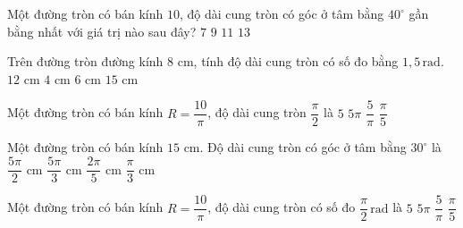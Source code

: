 

\begin{ex}%
	Một  đường tròn có bán kính $10$, độ dài cung tròn có góc ở tâm bằng $40^\circ$ gần bằng nhất với giá trị nào sau đây?
	 \choice
		{\True $7$} 
		{$9$} 
		 {$11$}
		 {$13$}
\end{ex}

\begin{ex}%
	Trên đường tròn đường kính $8$ cm, tính độ  dài cung tròn có số đo bằng $1{,}5\,\mathrm{rad}$.
	 \choice
		{$12$  cm}
		{$4$ cm} 
		{\True $6$  cm}
		{$15$  cm}
\end{ex}

\begin{ex}%
	Một đường tròn có bán kính $R=\dfrac{10}{\pi}$, độ dài cung tròn $\dfrac{\pi}{2}$ là 
	\choice 
		{\True $5$} 
		{$5\pi$} 
		{$\dfrac{5}{\pi}$} 
		{$\dfrac{\pi}{5}$} 
\end{ex}

\begin{ex}%
	Một đường tròn có bán kính $15$ cm. Độ dài cung tròn có  góc ở tâm bằng $30^\circ$ là
	 \choice
		{\True $\dfrac{5\pi}{2}$ cm} 
		{$\dfrac{5\pi}{3}$  cm}
		 {$\dfrac{2\pi}{5}$ cm}
		{$\dfrac{\pi}{3}$  cm}
\end{ex}

\begin{ex}%
	Một đường tròn có bán kính $R=\dfrac{10}{\pi}$, độ dài cung tròn có  số đo $\dfrac{\pi}{2}\,\mathrm{rad}$ là
	\choice 
		{\True $5$} 
		 {$5\pi$}
		 {$\dfrac{5}{\pi}$}
		 {$\dfrac{\pi}{5}$}
\end{ex}

